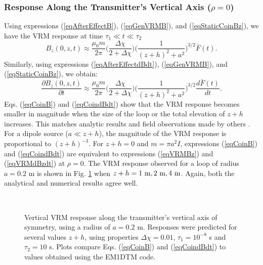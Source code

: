 \documentclass[journal]{IEEEtran}  %
\begin{document}
\subsubsection{Response Along the Transmitter's Vertical Axis ($\rho = 0$)}
Using expressions (\ref{eqAfterEffectB}),  (\ref{eqGenVRMB}), and
(\ref{eqStaticCoinBz}), we have the VRM response at time $\tau_1 \ll
t \ll \tau_2$
\begin{equation}
\label{eqCoinB} B_z(0,z,t)  \approx \frac{\mu_0 m}{2
\pi} \Bigg ( \frac{\Delta \chi}{2 + \Delta \chi} \Bigg ) \Bigg (
\frac{1}{(z+h)^2 + a^2} \Bigg )^{3/2} \bar F(t).
\end{equation}
Similarly, using expressions (\ref{eqAfterEffectdBdt}),
(\ref{eqGenVRMB}), and (\ref{eqStaticCoinBz}), we obtain:
\begin{equation}
\label{eqCoindBdt} \frac{\partial
B_z(0,z,t)}{\partial t}  \approx \frac{\mu_0 m}{2 \pi} \Bigg (
\frac{\Delta \chi}{2 + \Delta \chi} \Bigg ) \Bigg ( \frac{1}{(z+h)^2
+ a^2} \Bigg )^{3/2} \frac{d \bar F(t)}{dt}.
\end{equation}
Eqs. (\ref{eqCoinB}) and (\ref{eqCoindBdt}) show that the VRM
response becomes smaller in magnitude when the size of
the loop or the total elevation of $z+h$ increases. This
matches analytic results and field observations made by others
\cite{Lee1984,Buselli1982,Barsukov2001}. For a dipole source ($a\ll
z+h$), the magnitude of the VRM response is proportional to
$(z+h)^{-3}$. For $z+h=0$ and $m=\pi a^2 I$, expressions
(\ref{eqCoinB}) and (\ref{eqCoindBdt}) are equivalent to expressions
(\ref{eqVRMBz}) and (\ref{eqVRMdBzdt}) at $\rho=0$. The VRM response
observed for a loop of radius $a=0.2$ m is shown in Fig.
\ref{figVRMrespCoin} when $z + h = 1 ~{\rm m}, 2 ~{\rm m}, 4 ~{\rm
m}$. Again, both the analytical and numerical results agree well.
\begin{figure}[!h]
    \centering
    \vspace{-10pt}
    \\
    \vspace{-10pt}
    \caption{Vertical VRM response along the  transmitter’s
    vertical axis of symmetry, using a radius of $a = 0.2$ m.
    Responses were predicted for several values $z+h$,
    using properties $\Delta \chi = 0.01$, $\tau_1 =10^{-8}$ s and $\tau_2 =10$ s.
    Plots compare Eqs. (\ref{eqCoinB}) and (\ref{eqCoindBdt}) to values obtained using the EM1DTM code.}
    \label{figVRMrespCoin}
\end{figure}
%
\end{document}
